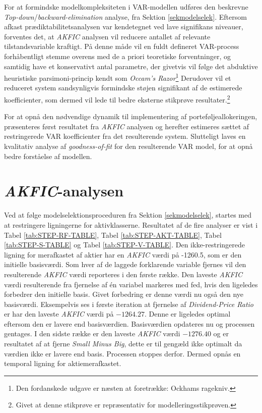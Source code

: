 \documentclass[
  a4paper,
  oneside]{memoir}
\begin{document}
For at formindske modelkompleksiteten i VAR-modellen udføres den beskrevne \emph{Top-down}/\emph{backward-elimination} analyse, fra Sektion \ref{sekmodelselek}. Eftersom afkast prædiktabilitetsanalysen var kendetegnet ved lave signifikans niveauer, forventes det, at \emph{AKFIC} analysen vil reducere antallet af relevante tilstandsvariable kraftigt. På denne måde vil en fuldt defineret VAR-process forhåbentligt stemme overens med de a priori teoretiske forventninger, og samtidig have et konservativt antal parametre, der givetvis vil følge det abduktive heuristiske parsimoni-princip kendt som \emph{Occam's Razor}\footnote{Den fordanskede udgave er næsten at foretrække: Ockhams ragekniv.} Derudover vil et reduceret system sandsynligvis formindske støjen signifikant af de estimerede koefficienter, som dermed vil lede til bedre eksterne stikprøve resultater.\footnote{Givet at denne stikprøve er repræsentativ for modelleringsstikprøven.}

For at opnå den nødvendige dynamik til implementering af porteføljeallokeringen, præsenteres først resultatet fra \emph{AKFIC} analysen og herefter estimeres sættet af restringerede VAR koefficienter fra det resulterende system. Slutteligt laves en kvalitativ analyse af \emph{goodness-of-fit} for den resulterende VAR model, for at opnå bedre forståelse af modellen.

\hypertarget{akficana}{%
\section{\texorpdfstring{\emph{AKFIC}-analysen}{AKFIC-analysen}}\label{akficana}}

Ved at følge modelselektionsproceduren fra Sektion \ref{sekmodelselek}, startes med at restringere ligningerne for aktivklasserne. Resultatet af de fire analyser er vist i Tabel \ref{tab:STEP-RF-TABLE}, Tabel \ref{tab:STEP-AKT-TABLE}, Tabel \ref{tab:STEP-S-TABLE} og Tabel \ref{tab:STEP-V-TABLE}. Den ikke-restringerede ligning for merafkastet af aktier har en \emph{AKFIC} værdi på -1260.5, som er den initielle basisværdi. Som hver af de laggede forklarende variable fjernes vil den resulterende \emph{AKFIC} værdi reporteres i den første række. Den laveste \emph{AKFIC} værdi resulterende fra fjernelse af én variabel markeres med fed, hvis den ligeledes forbedrer den initielle basis. Givet forbedring er denne værdi nu også den nye basisværdi. Eksempelvis ses i første iteration at fjernelse af \emph{Dividend-Price Ratio} er har den laveste \emph{AKFIC} værdi på \(-1264.27\). Denne er ligeledes optimal eftersom den er lavere end basisværdien. Basisværdien opdateres nu og processen gentages. I den sidste række er den laveste \emph{AKFIC} værdi \(-1276.40\) og er resultatet af at fjerne \emph{Small Minus Big}, dette er til gengæld ikke optimalt da værdien ikke er lavere end basis. Processen stoppes derfor. Dermed opnås en temporal ligning for aktiemerafkastet.
\end{document}
